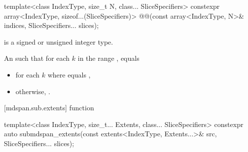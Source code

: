 %
\begin{itemdecl}
template<class IndexType, size_t N, class... SliceSpecifiers>
  constexpr array<IndexType, sizeof...(SliceSpecifiers)>
    @@(const array<IndexType, N>& indices, SliceSpecifiers... slices);
\end{itemdecl}

\begin{itemdescr}
\pnum
\mandates
{} is a signed or unsigned integer type.

\pnum
\returns
An  such that
for each $k$ in the range ,
 equals

\begin{itemize}
\item
 for each $k$
where  equals
,

\item
otherwise,
 \tcode{+}
.
\end{itemize}
\end{itemdescr}

[mdspan.sub.extents]{ function}

%
\begin{itemdecl}
template<class IndexType, size_t... Extents, class... SliceSpecifiers>
  constexpr auto submdspan_extents(const extents<IndexType, Extents...>& src,
                                   SliceSpecifiers... slices);
\end{itemdecl}

